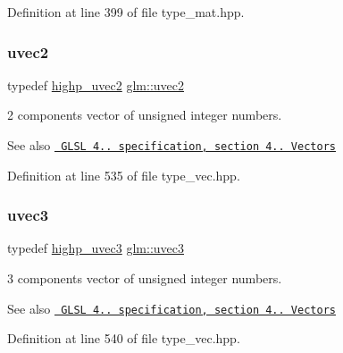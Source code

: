 Definition at line 399 of file type\+\_\+mat.\+hpp.

\mbox{\label{group__core__types_gafd2041b45eff671aa8899d2c2835eee9}} 
\subsubsection{\texorpdfstring{uvec2}{uvec2}}
{\footnotesize\ttfamily typedef \mbox{\hyperlink{group__core__precision_ga386eaa1579a0f5ad51cd7d8fcd52ec16}{highp\+\_\+uvec2}} \mbox{\hyperlink{group__core__types_gafd2041b45eff671aa8899d2c2835eee9}{glm\+::uvec2}}}

2 components vector of unsigned integer numbers.

\begin{DoxySeeAlso}{See also}
\href{http://www.opengl.org/registry/doc/GLSLangSpec.4.20.8.pdf}{\texttt{ G\+L\+SL 4.. specification, section 4.. Vectors}} 
\end{DoxySeeAlso}


Definition at line 535 of file type\+\_\+vec.\+hpp.

\mbox{\label{group__core__types_gac4ba593917841b859ba1683b8b52b8fa}} 
\subsubsection{\texorpdfstring{uvec3}{uvec3}}
{\footnotesize\ttfamily typedef \mbox{\hyperlink{group__core__precision_ga90ab9c4694f5af23c7dcd4eb9e47e255}{highp\+\_\+uvec3}} \mbox{\hyperlink{group__core__types_gac4ba593917841b859ba1683b8b52b8fa}{glm\+::uvec3}}}

3 components vector of unsigned integer numbers.

\begin{DoxySeeAlso}{See also}
\href{http://www.opengl.org/registry/doc/GLSLangSpec.4.20.8.pdf}{\texttt{ G\+L\+SL 4.. specification, section 4.. Vectors}} 
\end{DoxySeeAlso}


Definition at line 540 of file type\+\_\+vec.\+hpp.

\mbox{\label{group__core__types_ga1c426d19627b32b14f0089f7f4ba7b1d}} 
